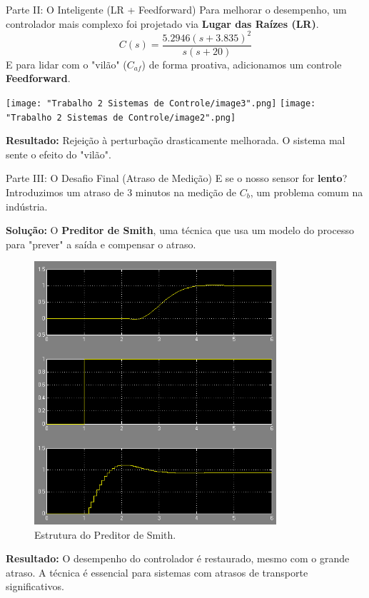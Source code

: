 \documentclass{beamer}
\begin{document}
\begin{frame}{Parte II: O Inteligente (LR + Feedforward)}
    \large Para melhorar o desempenho, um controlador mais complexo foi projetado via \textbf{Lugar das Raízes (LR)}.
    \[ C(s)=\frac{5.2946(s+3.835)^2}{s(s+20)} \]
    \vspace{0.5em}
    E para lidar com o "vilão" (\(C_{af}\)) de forma proativa, adicionamos um controle \textbf{Feedforward}.
    
    \texttt{[image: "Trabalho 2 Sistemas de Controle/image3".png]}
    \texttt{[image: "Trabalho 2 Sistemas de Controle/image2".png]}
    
    \textbf{Resultado:} Rejeição à perturbação drasticamente melhorada. O sistema mal sente o efeito do "vilão".
\end{frame}

\begin{frame}{Parte III: O Desafio Final (Atraso de Medição)}
    \large E se o nosso sensor for \textbf{lento}? Introduzimos um atraso de 3 minutos na medição de \(C_b\), um problema comum na indústria.
    \vspace{1em}
    
    \textbf{Solução:} O \textbf{Preditor de Smith}, uma técnica que usa um modelo do processo para "prever" a saída e compensar o atraso.
    
    \begin{figure}
        \includegraphics[width=0.8\textwidth]{Imagens/q13.png}
        \caption{Estrutura do Preditor de Smith.}
    \end{figure}
    
    \textbf{Resultado:} O desempenho do controlador é restaurado, mesmo com o grande atraso. A técnica é essencial para sistemas com atrasos de transporte significativos.
\end{frame}
\end{document}
